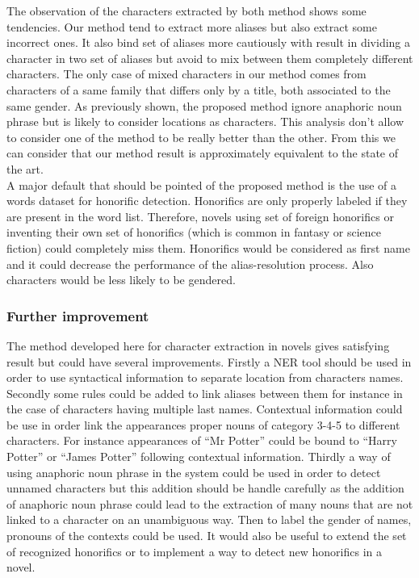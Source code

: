 \documentclass[a4paper, 12pt]{report}
\begin{document}
The observation of the characters extracted by both method shows some tendencies. Our method tend to extract more aliases but also extract some incorrect ones. It also bind set of aliases more cautiously with result in dividing a character in two set of aliases but avoid to mix between them completely different characters. The only case of mixed characters in our method comes from characters of a same family that differs only by a title, both associated to the same gender. As previously shown, the proposed method ignore anaphoric noun phrase but is likely to consider locations as characters. This analysis don't allow to consider one of the method to be really better than the other. From this we can consider that our method result is approximately equivalent to the state of the art. \\

A major default that should be pointed of the proposed method is the use of a words dataset for honorific detection. Honorifics are only properly labeled if they are present in the word list. Therefore, novels using set of foreign honorifics or inventing their own set of honorifics (which is common in fantasy or science fiction) could completely miss them. Honorifics would be considered as first name and it could decrease the performance of the alias-resolution process. Also characters would be less likely to be gendered. \\

\subsubsection{Further improvement}
The method developed here for character extraction in novels gives satisfying result but could have several improvements. 
Firstly a NER tool should be used in order to use syntactical information to separate location from characters names.
Secondly some rules could be added to link aliases between them for instance in the case of characters having multiple last names. 
Contextual information could be use in order link the appearances proper nouns of category 3-4-5 to different characters. 
For instance appearances of ``Mr Potter'' could be bound to ``Harry Potter'' or ``James Potter'' following contextual information. 
Thirdly a way of using anaphoric noun phrase in the system could be used in order to detect unnamed characters 
but this addition should be handle carefully as the addition of anaphoric noun phrase could lead to the extraction of many nouns that are not linked to a character on an unambiguous way. 
Then to label the gender of names, pronouns of the contexts could be used.
It would also be useful to extend the set of recognized honorifics or to implement a way to detect new honorifics in a novel.\\
\end{document}

